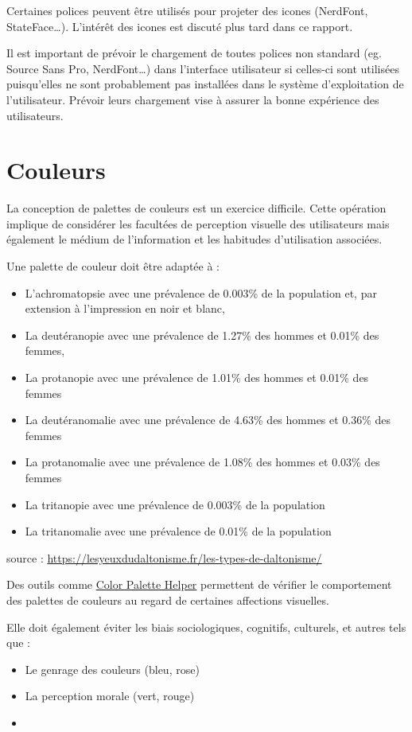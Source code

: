 \documentclass[a4paper,12pt]{article}
\begin{document}
\begin{multicols}{2}
Certaines polices peuvent être utilisés pour projeter des icones (NerdFont, StateFace\ldots{}).\autocite{jonathanschwabishQualitative2021} L'intérêt des icones est discuté plus tard dans ce rapport.

Il est important de prévoir le chargement de toutes polices non standard (eg. Source Sans Pro, NerdFont\ldots{}) dans l'interface utilisateur si celles-ci sont utilisées puisqu'elles ne sont probablement pas installées dans le système d'exploitation de l'utilisateur. Prévoir leurs chargement vise à assurer la bonne expérience des utilisateurs.
\section*{Couleurs}
\label{sec:orgf9689ff}
La conception de palettes de couleurs est un exercice difficile. Cette opération implique de considérer les facultées de perception visuelle des utilisateurs mais également le médium de l'information et les habitudes d'utilisation associées.

Une palette de couleur doit être adaptée à :
\begin{itemize}
\item L'achromatopsie avec une prévalence de 0.003\% de la population et, par extension à l'impression en noir et blanc,
\item La deutéranopie avec une prévalence de 1.27\% des hommes et 0.01\% des femmes,
\item La protanopie avec une prévalence de 1.01\% des hommes et 0.01\% des femmes
\item La deutéranomalie avec une prévalence de 4.63\% des hommes et 0.36\% des femmes
\item La protanomalie avec une prévalence de 1.08\% des hommes et 0.03\% des femmes
\item La tritanopie avec une prévalence de 0.003\% de la population
\item La tritanomalie avec une prévalence de 0.01\% de la population
\end{itemize}
source : \url{https://lesyeuxdudaltonisme.fr/les-types-de-daltonisme/}

Des outils comme \href{https://gka.github.io/palettes/\#/5|s|ce0072,96ffea,00ffad|ffffe0,ff005e,93003a|1|1}{Color Palette Helper} permettent de vérifier le comportement des palettes de couleurs au regard de certaines affections visuelles.

Elle doit également éviter les biais sociologiques, cognitifs, culturels, et autres tels que :
\begin{itemize}
\item Le genrage des couleurs (bleu, rose)
\item La perception morale (vert, rouge)
\item 
\end{itemize}


\end{multicols}
\end{document}
